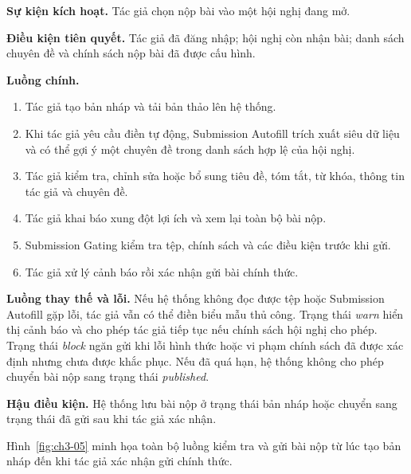 \textbf{Sự kiện kích hoạt.} Tác giả chọn nộp bài vào một hội nghị đang mở.

\textbf{Điều kiện tiên quyết.} Tác giả đã đăng nhập; hội nghị còn nhận bài; danh sách chuyên đề và chính sách nộp bài đã được cấu hình.

\textbf{Luồng chính.}

\begin{enumerate}
  \item Tác giả tạo bản nháp và tải bản thảo lên hệ thống.
  \item Khi tác giả yêu cầu điền tự động, Submission Autofill trích xuất siêu dữ liệu và có thể gợi ý một chuyên đề trong danh sách hợp lệ của hội nghị.
  \item Tác giả kiểm tra, chỉnh sửa hoặc bổ sung tiêu đề, tóm tắt, từ khóa, thông tin tác giả và chuyên đề.
  \item Tác giả khai báo xung đột lợi ích và xem lại toàn bộ bài nộp.
  \item Submission Gating kiểm tra tệp, chính sách và các điều kiện trước khi gửi.
  \item Tác giả xử lý cảnh báo rồi xác nhận gửi bài chính thức.
\end{enumerate}

\textbf{Luồng thay thế và lỗi.} Nếu hệ thống không đọc được tệp hoặc Submission Autofill gặp lỗi, tác giả vẫn có thể điền biểu mẫu thủ công. Trạng thái \textit{warn} hiển thị cảnh báo và cho phép tác giả tiếp tục nếu chính sách hội nghị cho phép. Trạng thái \textit{block} ngăn gửi khi lỗi hình thức hoặc vi phạm chính sách đã được xác định nhưng chưa được khắc phục. Nếu đã quá hạn, hệ thống không cho phép chuyển bài nộp sang trạng thái \textit{published}.

\textbf{Hậu điều kiện.} Hệ thống lưu bài nộp ở trạng thái bản nháp hoặc chuyển sang trạng thái đã gửi sau khi tác giả xác nhận.

Hình~\ref{fig:ch3-05} minh họa toàn bộ luồng kiểm tra và gửi bài nộp từ lúc tạo bản nháp đến khi tác giả xác nhận gửi chính thức. 

